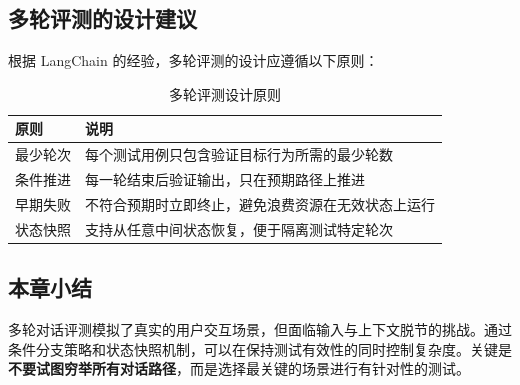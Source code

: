 \subsection{多轮评测的设计建议}

根据 LangChain 的经验，多轮评测的设计应遵循以下原则：

\begin{table}[H]
\centering
\caption{多轮评测设计原则}
\begin{tabular}{lp{9cm}}
\toprule
\textbf{原则} & \textbf{说明} \\
\midrule
最少轮次 & 每个测试用例只包含验证目标行为所需的最少轮数 \\
条件推进 & 每一轮结束后验证输出，只在预期路径上推进 \\
早期失败 & 不符合预期时立即终止，避免浪费资源在无效状态上运行 \\
状态快照 & 支持从任意中间状态恢复，便于隔离测试特定轮次 \\
\bottomrule
\end{tabular}
\end{table}

\subsection{本章小结}

多轮对话评测模拟了真实的用户交互场景，但面临输入与上下文脱节的挑战。通过条件分支策略和状态快照机制，可以在保持测试有效性的同时控制复杂度。关键是\textbf{不要试图穷举所有对话路径}，而是选择最关键的场景进行有针对性的测试。


